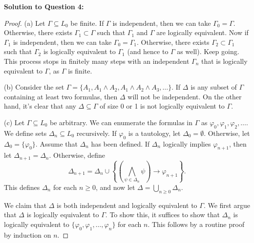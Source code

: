 \documentclass{article}
\begin{document}
\textbf{Solution to Question 4:}
\begin{proof}
(a) Let \(\Gamma \subseteq L_0\) be finite. If \(\Gamma\) is independent, then we can take \(\Gamma_0 = \Gamma\). Otherwise, there exists \(\Gamma_1 \subset \Gamma\) such that \(\Gamma_1\) and \(\Gamma\) are logically equivalent. Now if \(\Gamma_1\) is independent, then we can take \(\Gamma_0 = \Gamma_1\). Otherwise, there exists \(\Gamma_2 \subset \Gamma_1\) such that \(\Gamma_2\) is logically equivalent to \(\Gamma_1\) (and hence to \(\Gamma\) as well). Keep going. This process stops in finitely many steps with an independent \(\Gamma_n\) that is logically equivalent to \(\Gamma\), as \(\Gamma\) is finite.

(b) Consider the set \(\Gamma = \{A_1, A_1 \land A_2, A_1 \land A_2 \land A_3, \ldots\}\). If \(\Delta\) is any subset of \(\Gamma\) containing at least two formulas, then \(\Delta\) will not be independent. On the other hand, it’s clear that any \(\Delta \subseteq \Gamma\) of size 0 or 1 is not logically equivalent to \(\Gamma\).

(c) Let \(\Gamma \subseteq L_0\) be arbitrary. We can enumerate the formulas in \(\Gamma\) as \(\varphi_0, \varphi_1, \varphi_2, \ldots\). We define sets \(\Delta_n \subseteq L_0\) recursively. If \(\varphi_0\) is a tautology, let \(\Delta_0 = \emptyset\). Otherwise, let \(\Delta_0 = \{\varphi_0\}\). Assume that \(\Delta_n\) has been defined. If \(\Delta_n\) logically implies \(\varphi_{n+1}\), then let \(\Delta_{n+1} = \Delta_n\). Otherwise, define
\[
\Delta_{n+1} = \Delta_n \cup \left\{\left(\bigwedge_{\psi \in \Delta_n} \psi \right) \to \varphi_{n+1}\right\}.
\]
This defines \(\Delta_n\) for each \(n \geq 0\), and now let \(\Delta = \bigcup_{n \geq 0} \Delta_n\).

We claim that \(\Delta\) is both independent and logically equivalent to \(\Gamma\). We first argue that \(\Delta\) is logically equivalent to \(\Gamma\). 
To show this, it suffices to show that \(\Delta_n\) is logically equivalent to $\{\varphi_0, \varphi_1, \ldots, \varphi_n\}$ for each \(n\). This follows by a routine proof by induction on \(n\).


\end{proof}
\end{document}
